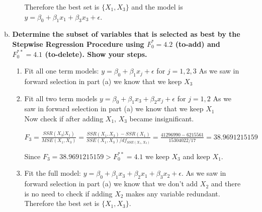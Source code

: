 \documentclass{article}
\begin{document}
\begin{enumerate}[1.]
\begin{enumerate}[(a)]
\begin{enumerate}[(1)]
Therefore the best set is $\{X_1, X_3\}$ and the model is $y = \beta_0 + \beta_1 x_1+ \beta_3x_3 + \epsilon$.

\end{enumerate}

\item \textbf{Determine the subset of variables that is selected as best by the Stepwise Regression
Procedure using $F_0^* = 4.2$ (to-add) and $F_0^{**} = 4.1$ (to-delete). Show your steps. }

\begin{enumerate}[(1)]
\item Fit all one term models: $y= \beta_0 + \beta_1x_j + \epsilon$ for $j = 1,2,3$
As we saw in forward selection in part (a) we know that we keep $X_3$

\item Fit all two term models $y = \beta_0 + \beta_1x_3 + \beta_2x_j + \epsilon$ for $j = 1,2$
As we saw in forward selection in part (a) we know that we keep $X_1$ \\

Now check if after adding $X_1$, $X_3$ became insignificant. 

$F_3 = \frac{ SSR(X_3 | X_1) }{ MSE(X_1, X_3)} = \frac{ SSR(X_1, X_3) - SSR(X_1)}{SSE(X_1, X_3)/df_{SSE(X_1, X_3)}} = \frac{41 296 990 - 6 215 561}{15 304 022/ 17} = 38.9691215159$

Since $F_3 = 38.9691215159 > F_0^{**} = 4.1$ we keep  $X_3$ and keep $X_1$. 

\item Fit the full model: $y = \beta_0 + \beta_1x_3 + \beta_2x_1 + \beta_3x_2 + \epsilon$.
As we saw in forward selection in part (a) we know that we don't add $X_2$ and there is no need to check if adding $X_2$ makes any variable redundant. Therefore the best set is $\{X_1, X_3\}$.

\end{enumerate}

\end{enumerate}


\end{enumerate}
\end{document}
